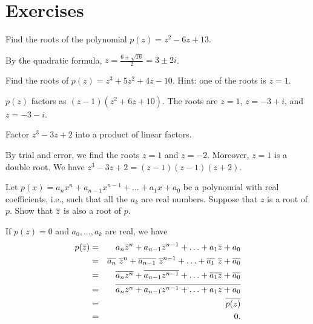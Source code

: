 \section*{Exercises}

\begin{ex}
  Find the roots of the polynomial $p(z) = z^2-6z+13$.
  \begin{sol}
    By the quadratic formula, $\displaystyle z=\frac{6\pm\sqrt{16}}{2}
      = 3\pm 2i$.
  \end{sol}
\end{ex}

\begin{ex}
  Find the roots of $p(z) = z^3 + 5z^2 + 4z - 10$. Hint: one of the
  roots is $z=1$.
  \begin{sol}
    $p(z)$ factors as $(z-1)(z^2+6z+10)$. The roots are $z=1$,
    $z=-3+i$, and $z=-3-i$.
  \end{sol}
\end{ex}

\begin{ex}
  Factor $z^3 - 3z + 2$ into a product of linear factors.
  \begin{sol}
    By trial and error, we find the roots $z=1$ and $z=-2$. Moreover,
    $z=1$ is a double root. We have $z^3 - 3z + 2 = (z-1)(z-1)(z+2)$.
  \end{sol}
\end{ex}

\begin{ex}
  Let $p(x) =a_nx^n+a_{n-1}x^{n-1}+\ldots+a_1x+a_0$ be a
  polynomial with real coefficients, i.e., such that all the $a_k$
  are real numbers. Suppose that $z$ is a root of $p$. Show that
  $\overline{z}$ is also a root of $p$.
  \begin{sol}
    If $p(z) =0$ and $a_0,\ldots,a_k$ are real, we have
    \begin{eqnarray*}
      p(\overline{z})
      &=& a_n\overline{z}^n+a_{n-1}\overline{z}^{n-1}+\ldots+a_1\overline{z}+a_0 \\
      &=&\overline{a_n}\ \overline{z}^n+\overline{a_{n-1}}
          \ \overline{z}^{n-1}+\ldots+\overline{a_1}
          \ \overline{z}+\overline{a_0}
      \\
      &=& \overline{a_nz^n}+\overline{a_{n-1}z^{n-1}}+\ldots+\overline{a_1z}+
          \overline{a_0} \\
      &=& \overline{a_nz^n+a_{n-1}z^{n-1}+\ldots+a_1z+a_0} \\
      &=& \overline{p(z)} \\
      &=& 0.
    \end{eqnarray*}
  \end{sol}
\end{ex}

